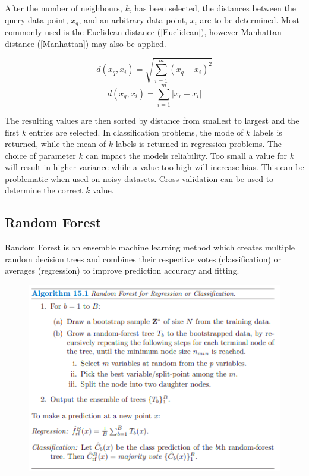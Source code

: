 \documentclass[a4paper,12pt]{report}
\begin{document}
After the number of neighbours, $k$, has been selected, the distances between the query data point, $x_q$, and an arbitrary data point, $x_i$ are to be determined.
Most commonly used is the Euclidean distance (\ref{Euclidean}), however Manhattan distance (\ref{Manhattan}) may also be applied.

\begin{equation} \label{Euclidean}
    d(x_q,x_i) = \sqrt{\sum_{i=1}^{m} (x_q - x_i)^2}
\end{equation}
\begin{equation} \label{Manhattan}
    d(x_q,x_i) = \sum_{i=1}^{m} \lvert x_r - x_i \rvert
\end{equation}

The resulting values are then sorted by distance from smallest to largest and the first $k$ entries are selected. 
In classification problems, the mode of $k$ labels is returned, while the mean of $k$ labels is returned in regression problems.
The choice of parameter $k$ can impact the models reliability. Too small a value for $k$ will result in higher variance while a value too high will increase bias. 
This can be problematic when used on noisy datasets. Cross validation can be used to determine the correct $k$ value.


\subsection{Random Forest}
Random Forest is an ensemble machine learning method which creates multiple random decision trees and combines their respective votes (classification) or averages (regression) to improve prediction accuracy and fitting.

\begin{figure}[h]
    \includegraphics[scale=0.7]{random_forest.png}
    \centering
    \label{fig:RF}
\end{figure}
\end{document}

